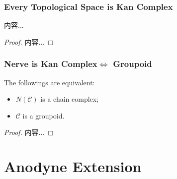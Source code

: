 \documentclass[Total.tex]{subfiles}
\begin{document}
			\subsubsection{Every Topological Space is Kan Complex}
				\begin{proposition}
					内容...
				\end{proposition}
				\begin{proof}
					内容...
				\end{proof}
			\subsubsection{Nerve is Kan Complex$\Leftrightarrow$ Groupoid}
				\begin{proposition}
					The followings are equivalent:
					\begin{itemize}
						\item $N(\mathcal{C})$ is a chain complex;
						\item $\mathcal{C}$ is a groupoid.
					\end{itemize}
				\end{proposition}
				\begin{proof}
					内容...
				\end{proof}
		\section{Anodyne Extension}
\end{document}
